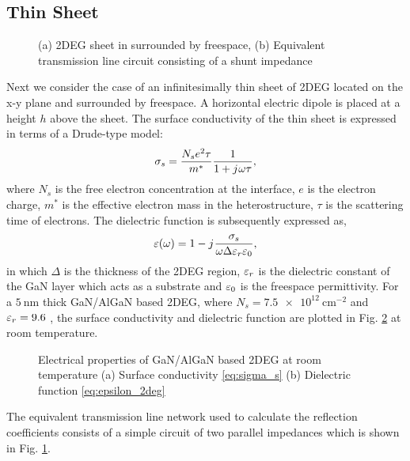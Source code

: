 \subsection{Thin Sheet}
%
\begin{figure}[t!]
  \centering
  \def\svgwidth{.75\linewidth}
  
  \caption{(a) 2DEG sheet in surrounded by freespace, (b) Equivalent transmission line circuit consisting of a shunt impedance}
  \label{fig:2deg_TL_equivalent}
\end{figure}
%
Next we consider the case of an infinitesimally thin sheet of 2DEG located on the x-y plane and surrounded by freespace. A horizontal electric dipole is placed at a height $h$ above the sheet. The surface conductivity of the thin sheet is expressed in terms of a Drude-type model:
%
\begin{equation}
  \sigma_s = \frac{N_s e^2 \tau}{m^{\ast}}\frac{1}{1 + {j}\mkern1mu \omega \tau},
  \label{eq:sigma_s}
\end{equation}
%
where $N_s$ is the free electron concentration at the interface, $e$ is the electron charge, $m^{\ast}$ is the effective electron mass in the heterostructure, $\tau$ is the scattering time of electrons. The dielectric function is subsequently expressed as,
%
\begin{equation}
  \varepsilon(\omega) =  1 - {j}\mkern1mu \frac{\sigma_s}{\omega \Delta \varepsilon_r \varepsilon_0},
  \label{eq:epsilon_2deg}
\end{equation}
%
in which $\Delta$ is the thickness of the 2DEG region, $\varepsilon_r$ is the dielectric constant of the GaN layer which acts as a substrate and $\varepsilon_0$ is the freespace permittivity. For a $\SI{5}{\nm}$ thick GaN/AlGaN based 2DEG, where $N_s = \SI[round-precision=2]{7.5e12}{\cm^{-2}}$ and $\varepsilon_r = 9.6$ \cite{Muravjov2010}, the surface conductivity and dielectric function are plotted in Fig. \ref{fig:Electric_properties_2DEG} at room temperature.
%
\begin{figure}[!htbp]
  \centering
  \caption{Electrical properties of GaN/AlGaN based 2DEG at room temperature (a) Surface conductivity \eqref{eq:sigma_s} (b) Dielectric function \eqref{eq:epsilon_2deg} }
  \label{fig:Electric_properties_2DEG}
\end{figure}
%
The equivalent transmission line network used to calculate the reflection coefficients consists of a simple circuit of two parallel impedances \cite{Hanson2008,Lovat2012,Gomez-Diaz2013} which is shown in Fig. \ref{fig:2deg_TL_equivalent}.

